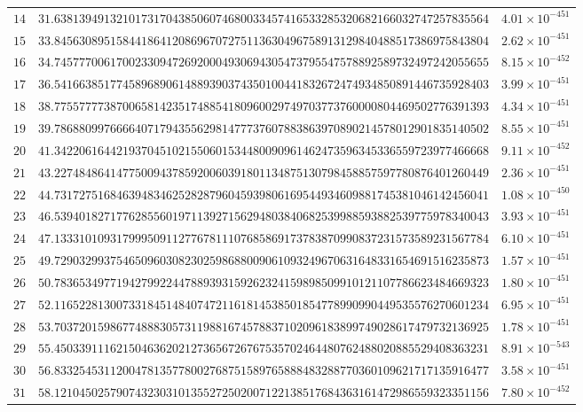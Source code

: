 \documentclass[12pt,reqno]{amsart}
\theoremstyle{remark}
\begin{document}
\begin{longtable}{clc}
$14$ & $31.6381394913210173170438506074680033457416533285320682166032747257835564$ & $4.01\times 10^{-451}$ \\
$15$ & $33.8456308951584418641208696707275113630496758913129840488517386975843804$ & $2.62\times 10^{-451}$ \\
$16$ & $34.7457770061700233094726920004930694305473795547578892589732497242055655$ & $8.15\times 10^{-452}$ \\
$17$ & $36.5416638517745896890614889390374350100441832672474934850891446735928403$ & $3.99\times 10^{-451}$ \\
$18$ & $38.7755777738700658142351748854180960029749703773760000804469502776391393$ & $4.34\times 10^{-451}$ \\
$19$ & $39.7868809976666407179435562981477737607883863970890214578012901835140502$ & $8.55\times 10^{-451}$ \\
$20$ & $41.3422061644219370451021550601534480090961462473596345336559723977466668$ & $9.11\times 10^{-452}$ \\
$21$ & $43.2274848641477500943785920060391801134875130798458857597780876401260449$ & $2.36\times 10^{-451}$ \\
$22$ & $44.7317275168463948346252828796045939806169544934609881745381046142456041$ & $1.08\times 10^{-450}$ \\
$23$ & $46.5394018271776285560197113927156294803840682539988593882539775978340043$ & $3.93\times 10^{-451}$ \\
$24$ & $47.1333101093179995091127767811107685869173783870990837231573589231567784$ & $6.10\times 10^{-451}$ \\
$25$ & $49.7290329937546509603082302598688009061093249670631648331654691516235873$ & $1.57\times 10^{-451}$ \\
$26$ & $50.7836534977194279922447889393159262324159898509910121107786623484669323$ & $1.80\times 10^{-451}$ \\
$27$ & $52.1165228130073318451484074721161814538501854778990990449535576270601234$ & $6.95\times 10^{-451}$ \\
$28$ & $53.7037201598677488830573119881674578837102096183899749028617479732136925$ & $1.78\times 10^{-451}$ \\
$29$ & $55.4503391116215046362021273656726767535702464480762488020885529408363231$ & $8.91\times 10^{-543}$ \\
$30$ & $56.8332545311200478135778002768751589765888483288770360109621717135916477$ & $3.58\times 10^{-451}$ \\
$31$ & $58.1210450257907432303101355272502007122138517684363161472986559323351156$ & $7.80\times 10^{-452}$ \\

\end{longtable}
\end{document}
